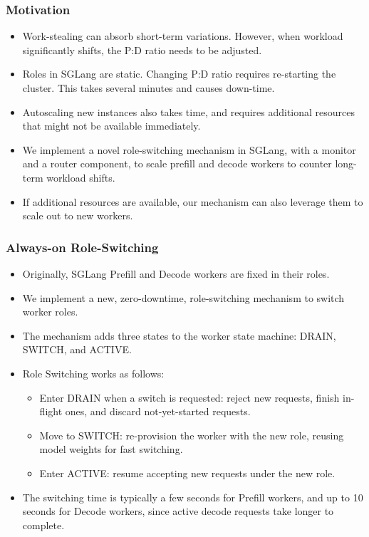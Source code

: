 \subsubsection{Motivation}
\begin{itemize}
    \item Work-stealing can absorb short-term variations. However, when workload significantly shifts, the P:D ratio needs to be adjusted.
    \item Roles in SGLang are static. Changing P:D ratio requires re-starting the cluster. This takes several minutes and causes down-time.
    \item Autoscaling new instances also takes time, and requires additional resources that might not be available immediately.
    \item We implement a novel role-switching mechanism in SGLang, with a monitor and a router component, to scale prefill and decode workers to counter long-term workload shifts.
    \item If additional resources are available, our mechanism can also leverage them to scale out to new workers.
\end{itemize}
\subsubsection{Always-on Role-Switching}
\begin{itemize}
  \item Originally, SGLang Prefill and Decode workers are fixed in their roles.
  \item We implement a new, zero-downtime, role-switching mechanism to switch worker roles.
  \item The mechanism adds three states to the worker state machine: \textsc{DRAIN}, \textsc{SWITCH}, and \textsc{ACTIVE}.
  \item Role Switching works as follows:
  \begin{itemize}
    \item Enter \textsc{DRAIN} when a switch is requested: reject new requests, finish in-flight ones, and discard not-yet-started requests.
    \item Move to \textsc{SWITCH}: re-provision the worker with the new role, reusing model weights for fast switching.
    \item Enter \textsc{ACTIVE}: resume accepting new requests under the new role.
  \end{itemize}
  \item The switching time is typically a few seconds for Prefill workers, and up to 10 seconds for Decode workers, since active decode requests take longer to complete. 
\end{itemize}

